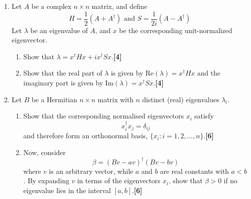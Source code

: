 \documentclass[a4paper]{article}
\begin{document}
\newpage
\begin{qns}\leavevmode
\begin{enumerate}[label=(\roman*)]
\item Let $A$ be a complex $n\times n$ matrix, and define
$$H=\frac{1}{2}(A+A^\dag)\text{ and }S=\frac{1}{2i}(A-A^\dag)$$
Let $\lambda$ be an eigenvalue of $A$, and $x$ be the corresponding unit-normalized eigenvector.
\begin{enumerate}[label=(\alph*)]
\item Show that $\lambda=x^\dag Hx+ix^\dag Sx$.\hfill \textbf{[4]}
\item Show that the real part of $\lambda$ is given by $\text{Re}(\lambda)=x^\dag Hx$ and the imaginary part is given by $\text{Im}(\lambda)=x^\dag Sx$.\hfill \textbf{[4]}
\end{enumerate}
\item Let $B$ be a Hermitian $n\times n$ matrix with $n$ distinct (real) eigenvalues $\lambda_i$.
\begin{enumerate}[label=(\alph*)]
\item Show that the corresponding normalised eigenvectors $x_i$ satisfy
$$x_i^\dag x_j=\delta_{ij}$$
and therefore form an orthonormal basis, $\{x_i:i=1,2,...,n\}$.\hfill \textbf{[6]}
\item Now, consider
$$\beta=(Bv-av)^\dag(Bv-bv)$$
where $v$ is an arbitrary vector, while $a$ and $b$ are real constants with $a < b$. By expanding $v$ in terms of the eigenvectors $x_i$, show that $\beta>0$ if no eigenvalue lies in the interval $[a, b]$.\hfill \textbf{[6]}
\end{enumerate}
\end{enumerate}
\end{qns}
\end{document}
